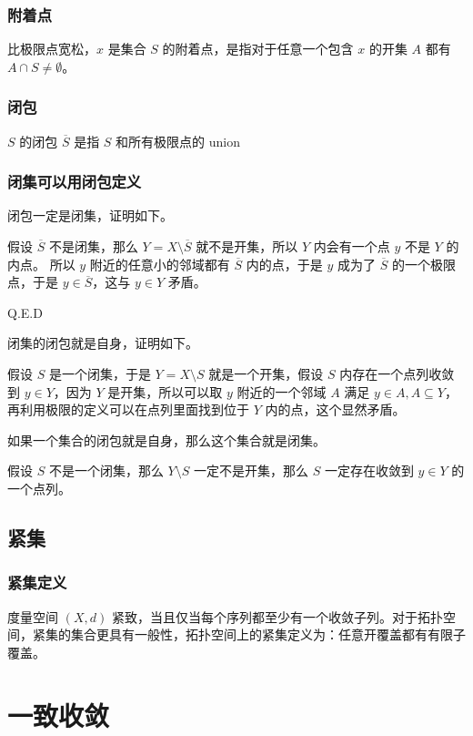 \subsection{附着点}

比极限点宽松，$x$ 是集合 $S$ 的附着点，是指对于任意一个包含 $x$ 的开集 $A$ 都有 $A \cap S \ne \emptyset$。

\subsection{闭包}
$S$ 的闭包 $\overline{S}$ 是指 $S$ 和所有极限点的 union

\subsection{闭集可以用闭包定义}

闭包一定是闭集，证明如下。

假设 $\overline{S}$ 不是闭集，那么 $ Y = X \setminus \overline{S}$ 就不是开集，所以 $Y$ 内会有一个点 $y$ 不是 $ Y$ 的内点。
所以 $y$ 附近的任意小的邻域都有 $ \overline{S}$ 内的点，于是 $y$ 成为了 $\overline{S}$ 的一个极限点，于是 $y \in \overline{S}$，这与 $y \in Y$ 矛盾。

Q.E.D

闭集的闭包就是自身，证明如下。

假设 $S$ 是一个闭集，于是 $Y = X \setminus S$ 就是一个开集，假设 $S$ 内存在一个点列收敛到 $y \in Y$，因为 $Y$ 是开集，所以可以取 $y$ 附近的一个邻域 $A$ 满足 
$ y \in A, A \subseteq Y $，再利用极限的定义可以在点列里面找到位于 $Y$ 内的点，这个显然矛盾。

如果一个集合的闭包就是自身，那么这个集合就是闭集。

假设 $S$ 不是一个闭集，那么 $ Y \setminus S$ 一定不是开集，那么 $ S $ 一定存在收敛到 $ y \in Y$ 的一个点列。 

\section{紧集}

\subsection{紧集定义}

度量空间 $(X,d)$ 紧致，当且仅当每个序列都至少有一个收敛子列。对于拓扑空间，紧集的集合更具有一般性，拓扑空间上的紧集定义为：任意开覆盖都有有限子覆盖。


\chapter{一致收敛}

